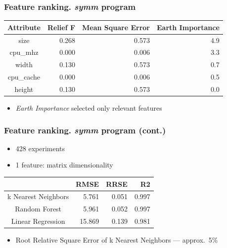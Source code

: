\documentclass{beamer}
\begin{document}
\begin{frame}
\frametitle{Feature ranking. \textit{symm} program}

	\begin{center}
	\begin{tabular}{|c|r|r|r|}
	\hline 
	Attribute & Relief F & Mean Square Error & Earth Importance \\ 
	\hline 
	size & 0.268 & 0.573 & 4.9 \\
	cpu\_mhz & 0.000 & 0.006 & 3.3 \\
	width & 0.130 & 0.573 & 0.7 \\
	cpu\_cache & 0.000 & 0.006 & 0.5 \\
	height & 0.130 & 0.573 & 0.0 \\
	\hline 
	\end{tabular} 
	\end{center}

	\begin{itemize}
		\item \textit{Earth Importance} selected only relevant features
	\end{itemize}
	
\end{frame}

\begin{frame}
\frametitle{Feature ranking. \textit{symm} program (cont.)}

	\begin{itemize}
		\item 428 experiments
		\item 1 feature: matrix dimensionality
	\end{itemize}

	\begin{center}
	\begin{tabular}{|c|r|r|r|}
	\hline 
	 & RMSE & RRSE & R2 \\ 
	\hline 
	k Nearest Neighbors & 5.761 & 0.051 & 0.997 \\ 
	Random Forest & 5.961 & 0.052 & 0.997 \\ 
	Linear Regression & 15.869 & 0.139 & 0.981 \\ 
	\hline 
	\end{tabular} 
	\end{center}

	\begin{itemize}
		\item Root Relative Square Error of k Nearest Neighbors --- approx.~5\%
	\end{itemize}
	
\end{frame}
\end{document}
